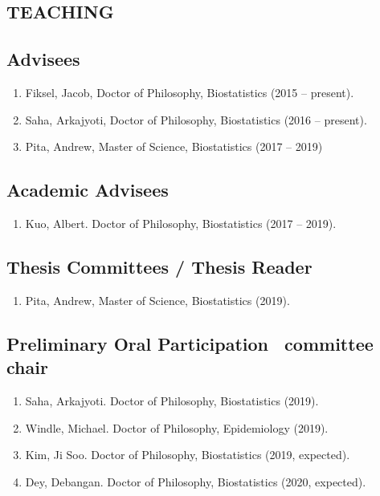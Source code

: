 \documentclass[10pt]{article}
\newcommand{\dn}[1]{{\color{black} {#1}}}
\newcommand{\myben}[1]{\smallskip\begin{enumerate}[start=1,label={\scriptsize \arabic*$\ $},leftmargin=\parindent]\setlength{\itemsep}{#1}\vspace*{-0.7em}}
\newcommand{\ee}{\end{enumerate}}
\newcommand{\mylift}[1]{\vspace*{#1}}
\begin{document}
\vspace*{0em}

\subsection*{TEACHING}

\smallskip

\subsection*{Advisees}

\myben{-0.1em}
\item Fiksel, Jacob, Doctor of Philosophy, Biostatistics (2015 -- present).
\item Saha, Arkajyoti, Doctor of Philosophy, Biostatistics (2016 -- present).
\item Pita, Andrew, Master of Science, Biostatistics (2017 -- 2019)

\ee

\mylift{-1.5em}

\subsection*{Academic Advisees}

\myben{-0.1em}

\item Kuo, Albert. Doctor of Philosophy, Biostatistics (2017 -- 2019).

\ee

\mylift{-1.5em}

\subsection*{Thesis Committees / Thesis Reader}

\myben{-0.1em}

\item \dn{Pita}, Andrew, Master of Science, Biostatistics (2019).
\ee

\mylift{-1.5em}

\subsection*{Preliminary Oral Participation \ \tiny * committee chair}

\myben{-0.1em}

\item \dn{Saha}, Arkajyoti. Doctor of Philosophy, Biostatistics (2019).
\item \dn{Windle}, Michael. Doctor of Philosophy, Epidemiology (2019).
\item \dn{Kim}, Ji Soo. Doctor of Philosophy, Biostatistics (2019, expected).
\item \dn{Dey}, Debangan. Doctor of Philosophy, Biostatistics (2020, expected).
\ee
\end{document}
